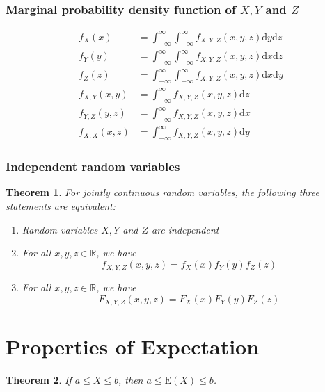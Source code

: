 \documentclass[12pt]{article}
\newcommand{\diff}{\mathrm{d}}
\newcommand{\expec}{\mathrm{E}}
\newtheorem{theorem}{Theorem}[section]
\theoremstyle{definition}
\begin{document}
\subsubsection{Marginal probability density function of $X,Y$ and $Z$}
\[
\begin{aligned}
f_X(x)&=\int_{-\infty}^\infty\int_{-\infty}^\infty f_{X,Y,Z}(x,y,z)\diff y\diff z\\
f_Y(y)&=\int_{-\infty}^\infty\int_{-\infty}^\infty f_{X,Y,Z}(x,y,z)\diff x\diff z\\
f_Z(z)&=\int_{-\infty}^\infty\int_{-\infty}^\infty f_{X,Y,Z}(x,y,z)\diff x\diff y\\
f_{X,Y}(x,y)&=\int_{-\infty}^\infty f_{X,Y,Z}(x,y,z)\diff z\\
f_{Y,Z}(y,z)&=\int_{-\infty}^\infty f_{X,Y,Z}(x,y,z)\diff x\\
f_{X,X}(x,z)&=\int_{-\infty}^\infty f_{X,Y,Z}(x,y,z)\diff y
\end{aligned}
\]
\subsubsection{Independent random variables}
\begin{theorem}\normalfont For jointly continuous random variables, the following three statements are equivalent:
\begin{enumerate}
\item Random variables $X,Y$ and $Z$ are independent
\item For all $x,y,z\in\mathbb{R}$, we have
\[
f_{X,Y,Z}(x,y,z)=f_X(x)f_Y(y)f_Z(z)
\]
\item For all $x,y,z\in\mathbb{R}$, we have
\[
F_{X,Y,Z}(x,y,z)=F_X(x)F_Y(y)F_Z(z)
\]
\end{enumerate}
\end{theorem}
\clearpage
\section{Properties of Expectation}
\begin{theorem}\normalfont If $a\leq X\leq b$, then $a\leq \expec(X)\leq b$.
\end{theorem}
\end{document}
